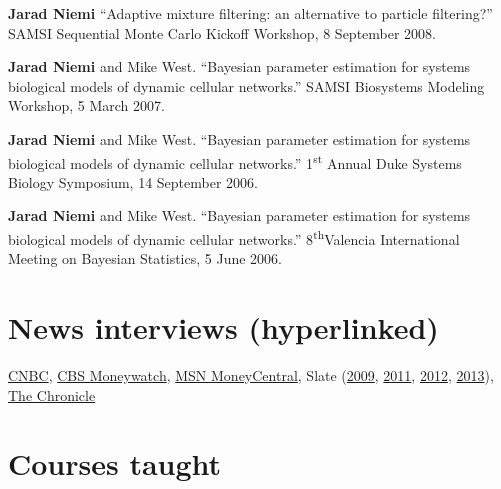 \documentclass[overlapped,line]{res}
\begin{document}
\begin{resume}
{{\bf Jarad Niemi} ``Adaptive mixture filtering: an alternative to particle filtering?'' SAMSI Sequential Monte Carlo Kickoff Workshop, 8 September 2008.

{\bf Jarad Niemi} and Mike West. ``Bayesian parameter estimation for systems biological models of dynamic cellular networks.'' SAMSI Biosystems Modeling Workshop, 5 March 2007.

{\bf Jarad Niemi} and Mike West. ``Bayesian parameter estimation for systems biological models of dynamic cellular networks.'' 1\textsuperscript{st} Annual Duke Systems Biology Symposium, 14 September 2006.

{\bf Jarad Niemi} and Mike West. ``Bayesian parameter estimation for systems biological models of dynamic cellular networks.'' 8\textsuperscript{th}Valencia International Meeting on Bayesian Statistics, 5 June 2006.

}

\section{\bf News interviews (hyperlinked)}

\href{http://www.nbcnews.com/business/slam-dunk-your-rivals-office-march-madness-pool-1C8912546}{CNBC}, %
\href{http://moneywatch.bnet.com/economic-news/article/ncaa-brackets-how-to-win-your-march-madness-pool/403055/?tag=main;related-link-0}{CBS Moneywatch}, 
\href{http://articles.moneycentral.msn.com/SmartSpending/blog/page.aspx?post=1704157}{MSN MoneyCentral}, 
Slate (\href{http://www.slate.com/id/2213974/pagenum/all/}{2009}, \href{http://www.slate.com/id/2288234/pagenum/all/}{2011}, 
\href{http://www.slate.com/articles/sports/sports_nut/2012/03/ncaa_basketball_tournament_bracket_act_like_a_hedge_fund_manager_and_pick_ohio_state_to_win_it_all_.single.html}{2012}, 
\href{http://www.slate.com/articles/sports/sports_nut/2012/03/ncaa_basketball_tournament_bracket_act_like_a_hedge_fund_manager_and_pick_ohio_state_to_win_it_all_.single.html}{2013}),
\href{http://dukechronicle.com/node/145805}{The Chronicle}





\section{\bf Courses taught}
\vspace{0.1in}


\end{resume}
\end{document}
